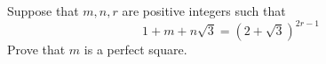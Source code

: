 Suppose that $m, n, r$ are positive integers such that
$$ 1 + m + n \sqrt{3} = (2 + \sqrt{3})^{2r-1} $$
Prove that $m$ is a perfect square.
